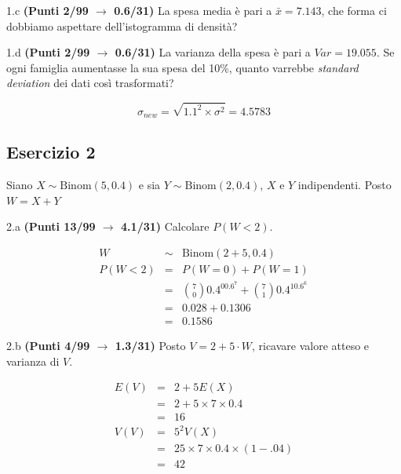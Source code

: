 \documentclass[
  11pt,
]{book}
\theoremstyle{mytheoremstyle}
\theoremstyle{mydefstyle}
\newenvironment{sol}
  {
  \begin{tcolorbox}[enhanced,breakable,arc=0.1mm,boxrule=1pt,colback=white,colframe=iblue,
  title=\bf \fontfamily{lmss}\selectfont \hspace{.5 cm} Soluzione,drop fuzzy shadow]

}{
\end{tcolorbox}
  }
\begin{document}
1.c \textbf{(Punti 2/99 \(\rightarrow\) 0.6/31)} La spesa media è pari a \(\bar x=7.143\), che forma ci dobbiamo aspettare dell'istogramma di densità?

1.d \textbf{(Punti 2/99 \(\rightarrow\) 0.6/31)} La varianza della spesa è pari a \(Var=19.055\).
Se ogni famiglia aumentasse la sua spesa del 10\%, quanto varrebbe \emph{standard deviation} dei dati così trasformati?

\begin{sol}
\[\sigma_{new}=\sqrt{1.1^2\times \sigma^2}=4.5783\]

\end{sol}

\subsection{Esercizio 2}\label{esercizio-2-12}

Siano \(X\sim \text{Binom}(5,0.4)\) e sia \(Y\sim \text{Binom}(2,0.4)\), \(X\) e \(Y\) indipendenti. Posto \(W=X+Y\)

2.a \textbf{(Punti 13/99 \(\rightarrow\) 4.1/31)} Calcolare \(P(W< 2)\).

\begin{sol}
\begin{eqnarray*}
  W &\sim& \text{Binom}(2+5,0.4)\\
  P(W<2) &=& P(W=0)+P(W=1)\\
  &=& \binom{7}{0}0.4^00.6^7+\binom{7}{1}0.4^10.6^6\\
  &=& 0.028+0.1306\\
  &=&0.1586
\end{eqnarray*}

\end{sol}

2.b \textbf{(Punti 4/99 \(\rightarrow\) 1.3/31)} Posto \(V=2+5\cdot W\), ricavare valore atteso e varianza di \(V\).

\begin{sol}
\begin{eqnarray*}
  E(V) &=& 2+5E(X)  \\
  &=& 2+5\times 7 \times 0.4\\
  &=& 16\\
  V(V) &=& 5^2V(X)  \\
  &=& 25\times 7\times 0.4\times (1-.04)\\
  &=& 42\\
\end{eqnarray*}

\end{sol}
\end{document}
